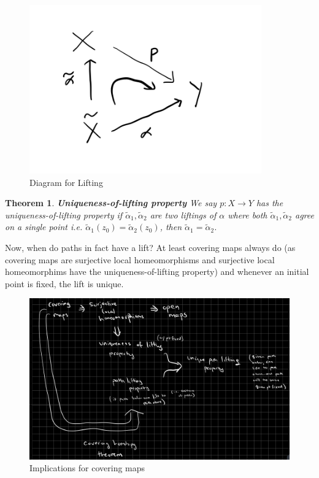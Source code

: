 \documentclass{article}
\newtheorem{theorem}{Theorem}[section]
\theoremstyle{definition}
\newcommand{\newword}[1]{\textbf{\emph{#1}}}
\begin{document}
\begin{figure}[H]
\centering
\includegraphics[width=10cm]{images/m3_lifting_diagram.png}
    \caption{\small{Diagram for Lifting}}
\label{img:m3_lifting_diagram}
\end{figure}

\begin{theorem}\newword{Uniqueness-of-lifting property}
We say $p: X \to Y$ has the uniqueness-of-lifting property if $\tilde{\alpha}_1, \tilde{\alpha}_2$ are two liftings of $\alpha$ where both $\tilde{\alpha}_1, \tilde{\alpha}_2$ agree on a single point i.e. $\tilde{\alpha}_{1}(z_0)=\tilde{\alpha}_{2}(z_0)$, then $\tilde{\alpha}_1 = \tilde{\alpha}_2$.
\end{theorem}

Now, when do paths in fact have a lift? At least covering maps always do (as covering maps are surjective local homeomorphisms and surjective local homeomorphims have the uniqueness-of-lifting property) and whenever an initial point is fixed, the lift is unique.

\begin{figure}[H]
\centering
\includegraphics[width=\textwidth]{images/m3_covering_maps_implications.png}
    \caption{\small{Implications for covering maps}}
\label{img:m3_covering_maps_implications}
\end{figure}
\end{document}
